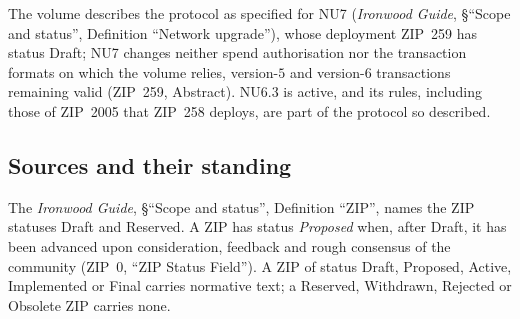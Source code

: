 \documentclass[11pt,a4paper]{article}
\theoremstyle{definition}
\begin{document}
The volume describes the protocol as specified for NU7 (\emph{Ironwood
Guide}, \S``Scope and status'', Definition ``Network upgrade''), whose
deployment ZIP~259 has status Draft; NU7 changes neither spend authorisation
nor the transaction formats on which the volume relies, version-\(5\) and
version-\(6\) transactions remaining valid (ZIP~259, Abstract). NU6.3 is
active, and its rules, including those of ZIP~2005 that ZIP~258 deploys, are
part of the protocol so described.

\subsection{Sources and their standing}\label{sec:intro-sources}

The \emph{Ironwood Guide}, \S``Scope and status'', Definition ``ZIP'', names
the ZIP statuses Draft and Reserved. A ZIP has status \emph{Proposed} when,
after Draft, it has been advanced upon consideration, feedback and rough
consensus of the community (ZIP~0, ``ZIP Status Field''). A ZIP of status
Draft, Proposed, Active, Implemented or Final carries normative text; a
Reserved, Withdrawn, Rejected or Obsolete ZIP carries none.
\end{document}
